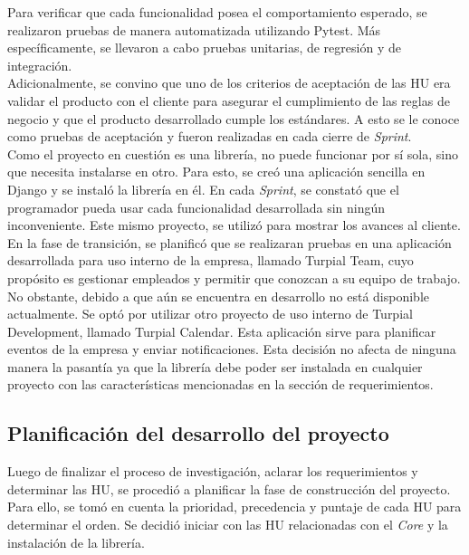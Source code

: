 Para verificar que cada funcionalidad posea el comportamiento esperado, se realizaron pruebas de manera automatizada utilizando Pytest. Más específicamente, se llevaron a cabo pruebas unitarias, de regresión y de integración. \\

Adicionalmente, se convino que uno de los criterios de aceptación de las HU era validar el producto con el cliente para asegurar el cumplimiento de las reglas de negocio y que el producto desarrollado cumple los estándares. A esto se le conoce como pruebas de aceptación y fueron realizadas en cada cierre de \textit{Sprint}. \\

Como el proyecto en cuestión es una librería, no puede funcionar por sí sola, sino que necesita instalarse en otro. Para esto, se creó una aplicación sencilla en Django y se instaló la librería en él. En cada \textit{Sprint}, se constató que el programador pueda usar cada funcionalidad desarrollada  sin ningún inconveniente. Este mismo proyecto, se utilizó para mostrar los avances al cliente.\\

En la fase de transición, se planificó que se realizaran pruebas en una aplicación desarrollada para uso interno de la empresa, llamado Turpial Team, cuyo propósito es gestionar empleados y permitir que conozcan a su equipo de trabajo. No obstante, debido a que aún se encuentra en desarrollo no está disponible actualmente. Se optó por utilizar otro proyecto de uso interno de Turpial Development, llamado Turpial Calendar. Esta aplicación sirve para planificar eventos de la empresa y enviar notificaciones. Esta decisión no afecta de ninguna manera la pasantía ya que la librería debe poder ser instalada en cualquier proyecto con las características mencionadas en la sección de requerimientos.

\subsection{Planificación del desarrollo del proyecto}

Luego de finalizar el proceso de investigación, aclarar los requerimientos y determinar las HU, se procedió a planificar la fase de construcción del proyecto. Para ello, se tomó en cuenta la prioridad, precedencia y puntaje de cada HU para determinar el orden. Se decidió iniciar con las HU relacionadas con el \textit{Core} y la instalación de la librería.\\

